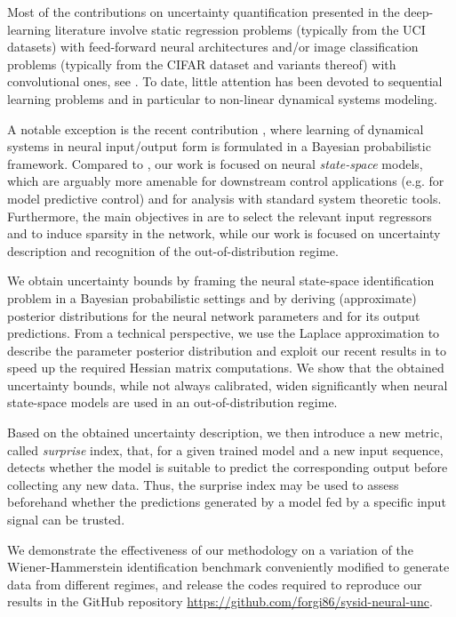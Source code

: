 \documentclass{ifacconf}
\begin{document}
Most of the contributions on uncertainty quantification presented in the deep-learning literature involve static regression problems (typically from the UCI datasets) with feed-forward neural architectures and/or image classification problems (typically from the CIFAR dataset and variants thereof) with convolutional ones, see \cite{maddox2019simple, wilson2020bayesian, izmailov2021bayesian}. To date, little attention has been devoted to sequential learning problems and in particular 
to non-linear dynamical systems modeling.

A notable exception is the recent contribution \citep{zhou2022sparse}, where learning of dynamical systems in neural input/output form is formulated  
in a Bayesian probabilistic framework. Compared to \citep{zhou2022sparse}, our work is focused on neural \emph{state-space} models, which are arguably more amenable for downstream control applications (e.g. for model predictive control) and for analysis with standard system theoretic tools. Furthermore, the main objectives in \citep{zhou2022sparse} are to select the relevant input regressors and to induce sparsity in the network, while our work is focused on uncertainty description and recognition of the out-of-distribution regime. 

We obtain uncertainty bounds by framing the neural state-space identification problem in a Bayesian probabilistic settings and by deriving 
(approximate) posterior distributions for the neural network parameters and for its output predictions.
From a technical perspective, we use the Laplace approximation \citep{bishop2006pattern} to describe the parameter posterior distribution and exploit our recent results 
in \citep{forgione2022adaptation} to speed up the required Hessian matrix computations.
We show that the obtained uncertainty bounds, while not always calibrated, widen significantly when neural state-space models are used in an out-of-distribution regime. 

Based on the obtained uncertainty description, we then introduce a new metric, called \emph{surprise} index, that, for a given trained model and a {new} input sequence, detects whether the model is suitable to predict the corresponding output before collecting any new data. 
Thus, the surprise index may be used to assess beforehand whether the predictions generated by a model fed by a specific input
signal can be trusted.

We demonstrate the effectiveness of our methodology on a variation of the Wiener-Hammerstein identification benchmark \citep{schoukens2009wiener} conveniently modified to generate data from different regimes, and release the codes required to reproduce our results in the GitHub repository \url{https://github.com/forgi86/sysid-neural-unc}.
\end{document}
